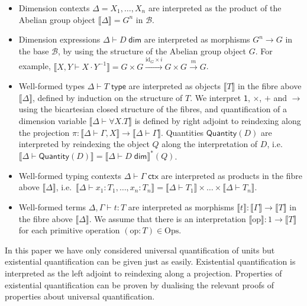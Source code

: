 \documentclass[a4paper,UKenglish]{lipics}
\theoremstyle{plain}
\newcommand{\ra}{\rightarrow}
\newcommand{\msf}[1]{\mathsf{#1}} %
\newcommand{\B}{\mathcal{B}}
\newcommand{\sem}[1]{\ensuremath{\llbracket #1 \rrbracket}}
\newcommand{\unitTy}{\msf{1}}
\newcommand{\qnt}{\msf{Quantity}}
\newcommand{\Dj}[2]{#1 \vdash #2 \; \msf{ dim}}
\newcommand{\id}{\mathrm{id}}
\begin{document}
\begin{itemize}
\item Dimension contexts $\Delta = X_1, \ldots, X_n$ are interpreted as the product of the Abelian group object $\sem{\Delta} = G^n$ in $\B$.
\item Dimension expressions $\Dj \Delta D$ are interpreted as morphisms $G^n \ra G$ in the base $\B$, by using the structure of the Abelian group object $G$. For example, $\sem{X, Y \vdash X \cdot Y^{-1}} = G\times G\xrightarrow{\id_G\times i}G\times G\xrightarrow m G$.

\item Well-formed types $\Delta \vdash T \; \msf{ type}$ are interpreted as objects $\sem{T}$ in the fibre above $\sem{\Delta}$,  defined by induction on the structure of $T$. We interpret $\unitTy$, $\times$, $+$ and $\rightarrow$ using the bicartesian closed structure of the fibres, and quantification of a dimension variable $\sem{\Delta \vdash \forall X. T}$ is defined by right adjoint to reindexing along the projection $\pi: \sem{\Delta \vdash \Gamma, X} \rightarrow \sem{\Delta \vdash \Gamma}$. Quantities $\qnt(D)$ are interpreted by reindexing the object $Q$ along the interpretation of $D$, i.e. $\sem{\Delta \vdash \qnt(D)} = {\sem{\Dj \Delta D}}^* (Q)$.

\item Well-formed typing contexts $\Delta \vdash \Gamma \; \msf{ ctx}$ are interpreted as products in the fibre above $\sem{\Delta}$, i.e.\ $\sem{\Delta \vdash x_1 : T_1 ,\ldots, x_n:T_n} = \sem{\Delta \vdash T_1} \times \ldots \times \sem{\Delta \vdash T_n}$.

\item Well-formed terms $\Delta, \Gamma \vdash t : T$ are interpreted as morphisms $\sem{t} : \sem{\Gamma} \ra \sem{T}$ in the fibre above $\sem{\Delta}$. We assume that there is an interpretation $\sem{\mathrm{op}} : 1 \to \sem{T}$ for each primitive operation $(\mathrm{op} : T) \in \mathrm{Ops}$.
\end{itemize}

In this paper we have only considered universal quantification of units but existential quantification can be given just as easily. Existential quantification is interpreted as the left adjoint to reindexing along a projection. Properties of  existential quantification can be proven by dualising the relevant proofs of properties about universal quantification.
\end{document}
